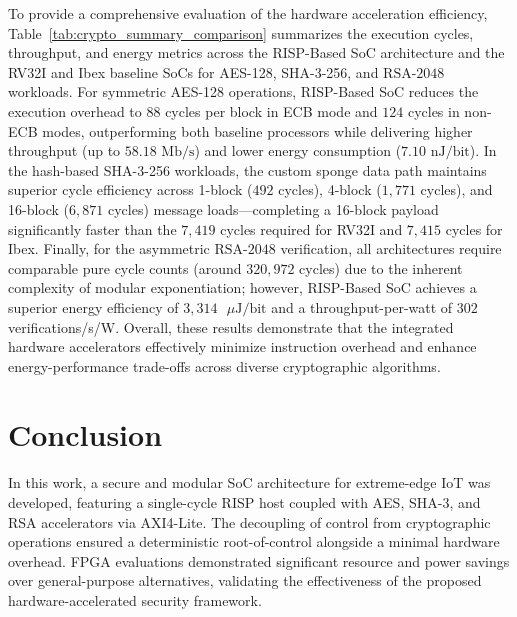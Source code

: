 To provide a comprehensive evaluation of the hardware acceleration efficiency, Table~\ref{tab:crypto_summary_comparison} summarizes the execution cycles, throughput, and energy metrics across the RISP-Based SoC architecture and the RV32I and Ibex baseline SoCs for AES-128, SHA-3-256, and $\text{RSA}\text{-}2048$ workloads. For symmetric AES-128 operations, RISP-Based SoC reduces the execution overhead to $88$ cycles per block in ECB mode and $124$ cycles in non-ECB modes, outperforming both baseline processors while delivering higher throughput (up to $58.18 \text{ Mb/s}$) and lower energy consumption ($7.10 \text{ nJ/bit}$). In the hash-based SHA-3-256 workloads, the custom sponge data path maintains superior cycle efficiency across 1-block ($492$ cycles), 4-block ($1,771$ cycles), and 16-block ($6,871$ cycles) message loads—completing a 16-block payload significantly faster than the $7,419$ cycles required for RV32I and $7,415$ cycles for Ibex. Finally, for the asymmetric $\text{RSA}\text{-}2048$ verification, all architectures require comparable pure cycle counts (around $320,972$ cycles) due to the inherent complexity of modular exponentiation; however, RISP-Based SoC achieves a superior energy efficiency of $3,314 \text{ }\mu\text{J/bit}$ and a throughput-per-watt of $302$ verifications/s/W. Overall, these results demonstrate that the integrated hardware accelerators effectively minimize instruction overhead and enhance energy-performance trade-offs across diverse cryptographic algorithms.

\section{Conclusion}
\label{sec:Conclusion}

In this work, a secure and modular SoC architecture for extreme-edge IoT was developed, featuring a single-cycle RISP host coupled with AES, SHA-3, and RSA accelerators via AXI4-Lite. The decoupling of control from cryptographic operations ensured a deterministic root-of-control alongside a minimal hardware overhead. FPGA evaluations demonstrated significant resource and power savings over general-purpose alternatives, validating the effectiveness of the proposed hardware-accelerated security framework.




